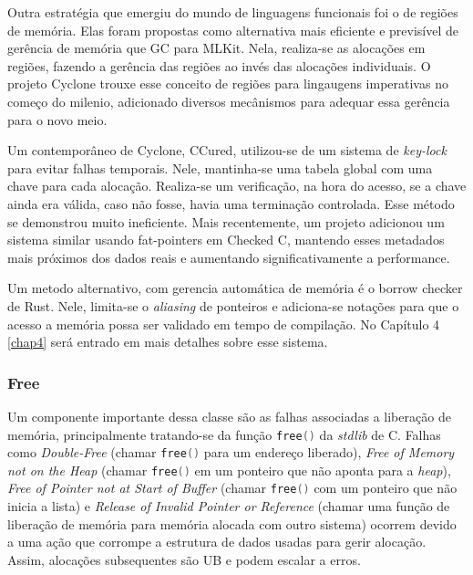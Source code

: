 \label{sec:mem-error:MemReg}
Outra estratégia que emergiu do mundo de linguagens funcionais foi o de regiões de memória\cite{REGMEM}. Elas foram propostas como alternativa mais eficiente e previsível de gerência de memória que GC para MLKit. Nela, realiza-se as alocações em regiões, fazendo a gerência das regiões ao invés das alocações individuais. O projeto Cyclone trouxe esse conceito de regiões para lingaugens imperativas no começo do milenio\cite{CYCLONEMEM}, adicionado diversos mecânismos para adequar essa gerência para o novo meio.

\label{sec:mem-error:KeyLock}
Um contemporâneo de Cyclone, CCured\cite{CCURED}, utilizou-se de um sistema de \emph{key-lock} para evitar falhas temporais. Nele, mantinha-se uma tabela global com uma chave para cada alocação. Realiza-se um verificação, na hora do acesso, se a chave ainda era válida, caso não fosse, havia uma terminação controlada. Esse método se demonstrou muito ineficiente. Mais recentemente, um projeto adicionou um sistema similar usando fat-pointers em Checked C\cite{FATPOINTERS}, mantendo esses metadados mais próximos dos dados reais e aumentando significativamente a performance.

\label{sec:mem-error:BorrowChecker}
Um metodo alternativo, com gerencia automática de memória é o borrow checker de Rust. Nele, limita-se o \emph{aliasing} de ponteiros e adiciona-se notações para que o acesso a memória possa ser validado em tempo de compilação. No Capítulo 4 \ref{chap4} será entrado em mais detalhes sobre esse sistema.

\subsubsection{Free}

\newcommand{\FREE}{\lstinline[language=C]|free()| }

Um componente importante dessa classe são as falhas associadas a liberação de memória, principalmente tratando-se da função \FREE da \emph{stdlib} de C. Falhas como \emph{Double-Free} (chamar \FREE para um endereço liberado), \emph{Free of Memory not on the Heap} (chamar \FREE em um ponteiro que não aponta para a \emph{heap}), \emph{Free of Pointer not at Start of Buffer} (chamar \FREE com um ponteiro que não inicia a lista) e \emph{Release of Invalid Pointer or Reference} (chamar uma função de liberação de memória para memória alocada com outro sistema) ocorrem devido a uma ação que corrompe a estrutura de dados usadas para gerir alocação. Assim, alocações subsequentes são UB e podem escalar a erros.

